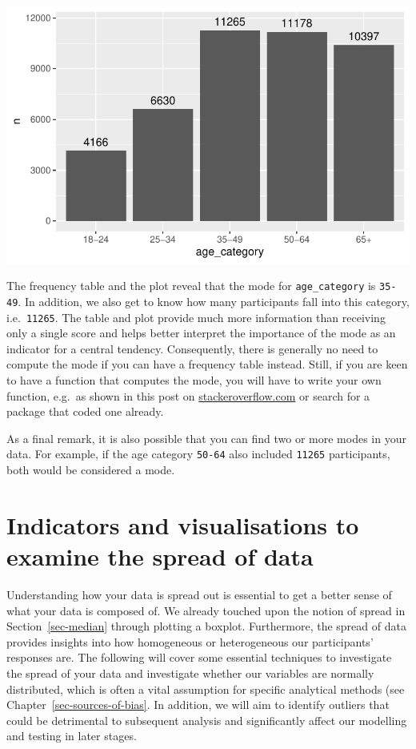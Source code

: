 \documentclass[
  letterpaper,
  DIV=11,
  numbers=noendperiod]{scrreprt}
\begin{document}
\includegraphics{08_descriptive_statistics_files/figure-latex/mode-visualised-as-freq-table-1.pdf}

The frequency table and the plot reveal that the mode for
\texttt{age\_category} is \texttt{35-49}. In addition, we also get to
know how many participants fall into this category, i.e.~\texttt{11265}.
The table and plot provide much more information than receiving only a
single score and helps better interpret the importance of the mode as an
indicator for a central tendency. Consequently, there is generally no
need to compute the mode if you can have a frequency table instead.
Still, if you are keen to have a function that computes the mode, you
will have to write your own function, e.g.~as shown in this post on
\href{https://stackoverflow.com/questions/2547402/how-to-find-the-statistical-mode}{stackeroverflow.com}
or search for a package that coded one already.

As a final remark, it is also possible that you can find two or more
modes in your data. For example, if the age category \texttt{50-64} also
included \texttt{11265} participants, both would be considered a mode.

\section{Indicators and visualisations to examine the spread of
data}\label{sec-spread-of-data}

Understanding how your data is spread out is essential to get a better
sense of what your data is composed of. We already touched upon the
notion of spread in Section~\ref{sec-median} through plotting a boxplot.
Furthermore, the spread of data provides insights into how homogeneous
or heterogeneous our participants' responses are. The following will
cover some essential techniques to investigate the spread of your data
and investigate whether our variables are normally distributed, which is
often a vital assumption for specific analytical methods (see
Chapter~\ref{sec-sources-of-bias}. In addition, we will aim to identify
outliers that could be detrimental to subsequent analysis and
significantly affect our modelling and testing in later stages.
\end{document}
